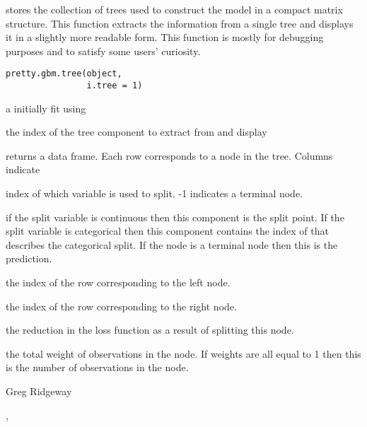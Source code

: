 \begin{Description}\relax
{} stores the collection of trees used to construct the model in a 
compact matrix structure. This function extracts the information from a single
tree and displays it in a slightly more readable form. This function is mostly
for debugging purposes and to satisfy some users' curiosity.
\end{Description}
\begin{Usage}
\begin{verbatim}
pretty.gbm.tree(object, 
                i.tree = 1)
\end{verbatim}
\end{Usage}
\begin{Arguments}
\begin{ldescription}
\item[\code{object}] a  initially fit using 
\item[\code{i.tree}] the index of the tree component to extract from  
and display 
\end{ldescription}
\end{Arguments}
\begin{Value}
 returns a data frame. Each row corresponds to a node in 
the tree. Columns indicate
\begin{ldescription}
\item[\code{SplitVar}] index of which variable is used to split. -1 indicates a 
terminal node.
\item[\code{SplitCodePred}] if the split variable is continuous then this component
is the split point. If the split variable is categorical then this component
contains the index of  that describes the categorical
split. If the node is a terminal node then this is the prediction.
\item[\code{LeftNode}] the index of the row corresponding to the left node.
\item[\code{RightNode}] the index of the row corresponding to the right node.
\item[\code{ErrorReduction}] the reduction in the loss function as a result of 
splitting this node.
\item[\code{Weight}] the total weight of observations in the node. If weights are all
equal to 1 then this is the number of observations in the node.
\end{ldescription}
\end{Value}
\begin{Author}\relax
Greg Ridgeway 
\end{Author}
\begin{SeeAlso}\relax
{}, 
\end{SeeAlso}

